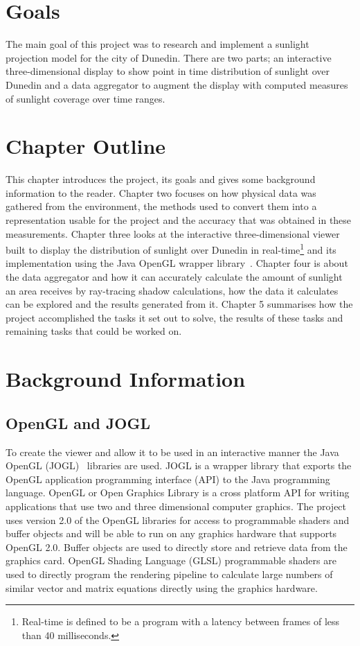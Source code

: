 \documentclass[12pt]{report}
\newcommand{\notedme}[1]{}
\begin{document}
\section{Goals}
The main goal of this project was to research and implement a sunlight projection model for the city of Dunedin. There are two parts; an interactive three-dimensional display to show point in time distribution of sunlight over Dunedin and a data aggregator to augment the display with computed measures of sunlight coverage over time ranges.

\section{Chapter Outline}
This chapter introduces the project, its goals and gives some background information to the reader. Chapter two focuses on how physical data was gathered from the environment, the methods used to convert them into a representation usable for the project and the accuracy that was obtained in these measurements. Chapter three looks at the interactive three-dimensional viewer built to display the distribution of sunlight over Dunedin in real-time\footnote{Real-time is defined to be a program with a latency between frames of less than 40 milliseconds.}\notedme{Not clear _who_ definees it to be less than 40ms.} and its implementation using the Java OpenGL wrapper library~\cite{JOGL}. Chapter four is about the data aggregator and how it can accurately calculate the amount of sunlight an area receives by ray-tracing shadow calculations, how the data it calculates can be explored and the results generated from it. Chapter 5 summarises how the project accomplished the tasks it set out to solve, the results of these tasks and remaining tasks that could be worked on.

\section{Background Information}
\subsection{OpenGL and JOGL} 
To create the viewer and allow it to be used in an interactive manner the Java OpenGL (JOGL)~\cite{JOGL} libraries are used. JOGL is a wrapper library that exports the OpenGL application programming interface (API) to the Java programming language. OpenGL or Open Graphics Library is a cross platform API for writing applications that use two and three dimensional computer graphics. The project uses version 2.0 of the OpenGL libraries for access to programmable shaders and buffer objects and will be able to run on any graphics hardware that supports OpenGL 2.0. Buffer objects are used to directly store and retrieve data from the graphics card.
OpenGL Shading Language (GLSL) programmable shaders are used to directly program the rendering pipeline to calculate large numbers of similar vector and matrix equations directly using the graphics hardware.
\end{document}
